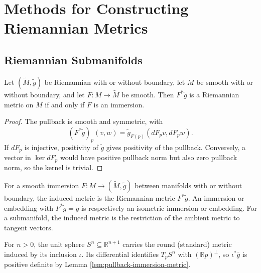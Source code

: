 \section{Methods for Constructing Riemannian Metrics}

\subsection*{Riemannian Submanifolds}

\begin{lemma}
\label{lem:pullback-immersion-metric}





Let $(\widetilde M,\widetilde g)$ be Riemannian with or without boundary, let $M$ be smooth with or without boundary, and let $F:M\to\widetilde M$ be smooth. Then $F^*\widetilde g$ is a Riemannian metric on $M$ if and only if $F$ is an immersion.
\end{lemma}
\begin{proof}

\sketch The pullback is smooth and symmetric, with
\[
(F^*\widetilde g)_p(v,w)=\widetilde g_{F(p)}(dF_pv,dF_pw).
\]
If $dF_p$ is injective, positivity of $\widetilde g$ gives positivity of the pullback. Conversely, a vector in $\ker dF_p$ would have positive pullback norm but also zero pullback norm, so the kernel is trivial.
\end{proof}

\begin{definition}
\label{def:induced-metric}





For a smooth immersion $F:M\to(\widetilde M,\widetilde g)$ between manifolds with or without boundary, the induced metric is the Riemannian metric $F^*\widetilde g$. An immersion or embedding with $F^*\widetilde g=g$ is respectively an isometric immersion or embedding. For a submanifold, the induced metric is the restriction of the ambient metric to tangent vectors.
\end{definition}

\begin{definition}[Spheres]
\label{ex:spheres}





For $n>0$, the unit sphere $S^n\subseteq\mathbb R^{n+1}$ carries the round (standard) metric induced by its inclusion $\iota$. Its differential identifies $T_pS^n$ with $(\mathbb Rp)^\perp$, so $\iota^*\bar g$ is positive definite by Lemma \ref{lem:pullback-immersion-metric}.
\end{definition}


